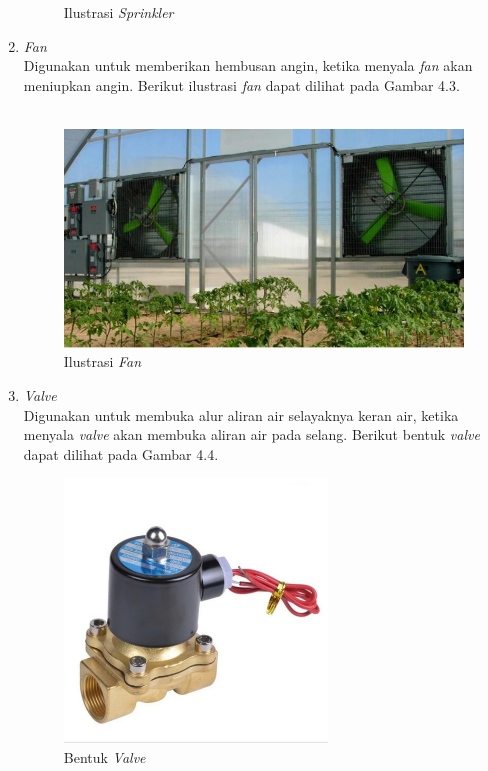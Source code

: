 \begin{flushleft}
\begin{justify}
\begin{enumerate}
\begin{figure}[ht]
                \caption{Ilustrasi \textit{Sprinkler}}
            \end{figure}
            \item \emph{Fan} 
            \\Digunakan untuk memberikan hembusan angin, ketika menyala \emph{fan} akan meniupkan angin.
            Berikut ilustrasi \emph{fan} dapat dilihat pada Gambar 4.3.\\\\
            \begin{figure}[ht]
                \centering
                \includegraphics[width=11cm]{images/bab 4/gambar_fan.png}
                \caption{Ilustrasi \textit{Fan}}
            \end{figure}
            \item \emph{Valve} 
            \\Digunakan untuk membuka alur aliran air selayaknya keran air, ketika menyala \emph{valve} akan membuka aliran air pada selang.
            Berikut bentuk \emph{valve} dapat dilihat pada Gambar 4.4.
            \begin{figure}[ht]
                \centering
                \includegraphics[width=7cm]{images/bab 4/gambar_valve.jpeg}
                \caption{Bentuk \textit{Valve}}
            \end{figure}

\end{enumerate}
\end{justify}
\end{flushleft}
